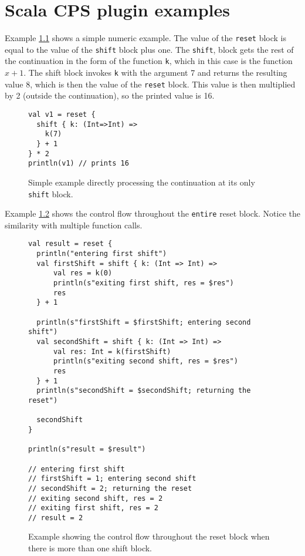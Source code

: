
\chapter{Scala CPS plugin examples}\label{chap:cps-examples}

Example \ref{fig:example_cps_1} shows a simple numeric example. The value of the \texttt{reset} block is equal to the value of the \texttt{shift} block plus one. The \texttt{shift}, block gets the rest of the continuation in the form of the function \texttt{k}, which in this case is the function \(x + 1\). The shift block invokes \texttt{k} with the argument 7 and returns the resulting value 8, which is then the value of the \texttt{reset} block. This value is then multiplied by 2 (outside the continuation), so the printed value is 16.

\begin{figure}[h!] \label{fig:example_cps_1}
\begin{lstlisting}
val v1 = reset {
  shift { k: (Int=>Int) =>
    k(7)
  } + 1
} * 2
println(v1) // prints 16
\end{lstlisting}
\caption{Simple example directly processing the continuation at its only \texttt{shift} block.}
\end{figure}

Example \ref{fig:example_cps_step_by_step} shows the control flow throughout the \texttt{entire} reset block. Notice the similarity with multiple function calls.

\begin{figure}[h!] \label{fig:example_cps_step_by_step}
\begin{lstlisting}
val result = reset {
  println("entering first shift")
  val firstShift = shift { k: (Int => Int) =>
      val res = k(0)
      println(s"exiting first shift, res = $res")
      res
  } + 1

  println(s"firstShift = $firstShift; entering second shift")
  val secondShift = shift { k: (Int => Int) =>
      val res: Int = k(firstShift)
      println(s"exiting second shift, res = $res")
      res
  } + 1
  println(s"secondShift = $secondShift; returning the reset")

  secondShift
}

println(s"result = $result")

// entering first shift
// firstShift = 1; entering second shift
// secondShift = 2; returning the reset
// exiting second shift, res = 2
// exiting first shift, res = 2
// result = 2
\end{lstlisting}
\caption{Example showing the control flow throughout the reset block when there is more than one shift block.}
\end{figure}

